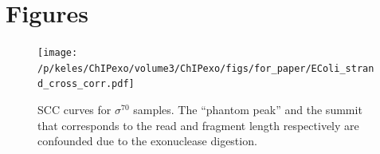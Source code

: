 \documentclass{bmcart}\usepackage[]{graphicx}\usepackage[]{color}
\newcommand{\sig}{\sigma^{70}}
\begin{document}




\newpage

\section{Figures}

\begin{figure}[h!]
\centering
\texttt{[image: /p/keles/ChIPexo/volume3/ChIPexo/figs/for\_paper/EColi\_strand\_cross\_corr.pdf]}
  \caption{SCC curves for $\sig$ samples. The ``phantom peak'' and the
    summit that corresponds to the read and fragment length
    respectively are confounded due to the exonuclease digestion.}
  \label{fig:scc_exo}
\end{figure}

\newpage
\end{document}
